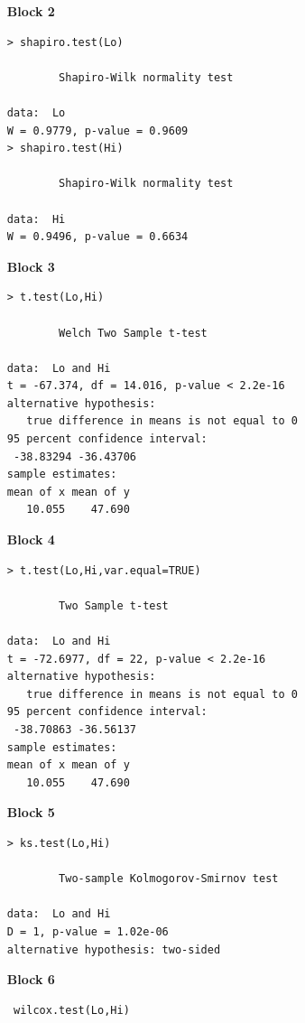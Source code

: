 \documentclass[a4paper,12pt]{article}
\begin{document}
\begin{itemize}
\begin{itemize}
\item[\textbf{Block 2}]
\begin{framed}
\begin{verbatim}
> shapiro.test(Lo)

        Shapiro-Wilk normality test

data:  Lo
W = 0.9779, p-value = 0.9609
> shapiro.test(Hi)

        Shapiro-Wilk normality test

data:  Hi
W = 0.9496, p-value = 0.6634
\end{verbatim}
\end{framed}
\bigskip
\item[\textbf{Block 3}]
\begin{framed}
\begin{verbatim}
> t.test(Lo,Hi)

        Welch Two Sample t-test

data:  Lo and Hi
t = -67.374, df = 14.016, p-value < 2.2e-16
alternative hypothesis: 
   true difference in means is not equal to 0
95 percent confidence interval:
 -38.83294 -36.43706
sample estimates:
mean of x mean of y 
   10.055    47.690 
\end{verbatim}
\end{framed}
\newpage
\item[\textbf{Block 4}]
\begin{framed}
\begin{verbatim}
> t.test(Lo,Hi,var.equal=TRUE)

        Two Sample t-test

data:  Lo and Hi
t = -72.6977, df = 22, p-value < 2.2e-16
alternative hypothesis: 
   true difference in means is not equal to 0
95 percent confidence interval:
 -38.70863 -36.56137
sample estimates:
mean of x mean of y 
   10.055    47.690 

\end{verbatim}
\end{framed}



\item[\textbf{Block 5}]
\begin{framed}
\begin{verbatim}
> ks.test(Lo,Hi)

        Two-sample Kolmogorov-Smirnov test

data:  Lo and Hi
D = 1, p-value = 1.02e-06
alternative hypothesis: two-sided

\end{verbatim}
\end{framed}
\item[\textbf{Block 6}]
\begin{framed}
\begin{verbatim}
 wilcox.test(Lo,Hi)


\end{verbatim}
\end{framed}
\end{itemize}
\end{itemize}
\end{document}
